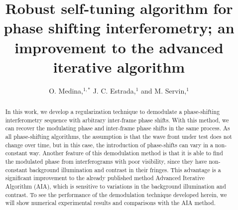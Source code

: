 \documentclass[letterpaper,12pt]{article}   %
\begin{document}
\title{Robust self-tuning algorithm for phase shifting interferometry; an improvement 
to the advanced iterative algorithm}

\author{O. Medina,$^{1,*}$ J. C. Estrada,$^{1}$ and M. Servin,$^{1}$}

\address{$^1$Centro de Investigaciones en Optica A. C., Loma del bosque 115, Col. Lomas 
del Campestre, Leon Guanajuato, 37150, Mexico}

\address{$^*$Corresponding author: orlandomedina@cio.mx}

\maketitle

\begin{abstract}
In this work, we develop a regularization technique to demodulate a  phase-shifting 
interferometry sequence with arbitrary inter-frame phase shifts. With this method, 
we can recover the modulating phase and inter-frame phase shifts in the same process. 
As all phase-shifting algorithms, the assumption is that the wave front under test does 
not change over time, but in this case, the introduction of phase-shifts can vary in a 
non-constant way. Another feature of this demodulation method is that it is able to find 
the modulated phase from interferograms with poor visibility, since they have non-constant
background illumination and contrast in their fringes. This advantage is a 
significant improvement to the already published method Advanced Iterative Algorithm (AIA), 
which is sensitive to variations in the background illumination and contrast. To see the 
performance of the demodulation technique developed herein, we will show numerical 
experimental results and comparisons with the AIA method.
\end{abstract}
\end{document}
